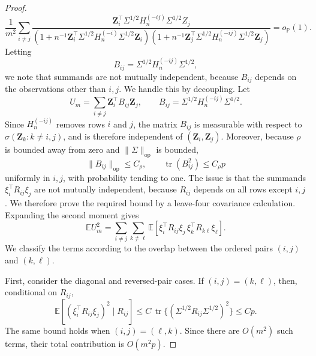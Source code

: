 \documentclass{article}
\theoremstyle{plain}
\theoremstyle{remark}
\def \bZ{\mathbf{Z}}
\def \E{\mathbb{E}}
\def \P{\mathbb{P}}
\def \bZ {{\boldsymbol{Z}}}
\begin{document}
\begin{proof}
\[
\frac{1}{m^2}
\sum_{i\ne j}
\frac{
\bZ_i^\top \Sigma^{1/2}H_n^{(-ij)}\Sigma^{1/2}Z_j
}{
\left(1+n^{-1}\bZ_i^\top \Sigma^{1/2}H_n^{(-i)}\Sigma^{1/2}\bZ_i\right)
\left(1+n^{-1}\bZ_j^\top \Sigma^{1/2}H_n^{(-ij)}\Sigma^{1/2}\bZ_j\right)
}
=o_{\P}(1).
\]
Letting 
\[
B_{ij}=\Sigma^{1/2}H_n^{(-ij)}\Sigma^{1/2},
\]
we note that summands are not mutually independent, because \(B_{ij}\) depends on the
observations other than \(i,j\).  We handle this by decoupling.  Let \[
U_m=\sum_{i\ne j}\bZ_i^\top B_{ij}\bZ_j,
\qquad
B_{ij}=\Sigma^{1/2}H_n^{(-ij)}\Sigma^{1/2}.
\]
Since \(H_n^{(-ij)}\) removes rows \(i\) and \(j\), the matrix \(B_{ij}\) is
measurable with respect to \(\sigma(\bZ_k:k\ne i,j)\), and is therefore
independent of \((\bZ_i,\bZ_j)\).  Moreover, because \(\rho\) is bounded away from
zero and \(\|\Sigma\|_{\mathrm{op}}\) is bounded,
\[
\|B_{ij}\|_{\mathrm{op}}\le C_\rho,\qquad
\operatorname{tr}(B_{ij}^2)\le C_\rho p
\]
uniformly in \(i,j\), with probability tending to one. The issue is that the summands \(\xi_i^\top R_{ij}\xi_j\) are not mutually independent, because
\(R_{ij}\) depends on all rows except \(i,j\).  We therefore prove the required bound by a
leave-four covariance calculation.  Expanding the second moment gives
\[
\E U_m^2
=
\sum_{i\ne j}\sum_{k\ne \ell}
\E\left[
\xi_i^\top R_{ij}\xi_j\,
\xi_k^\top R_{k\ell}\xi_\ell
\right].
\]
We classify the terms according to the overlap between the ordered pairs \((i,j)\) and
\((k,\ell)\).

First, consider the diagonal and reversed-pair cases.  If \((i,j)=(k,\ell)\), then, conditional on
\(R_{ij}\),
\[
\E\left[(\xi_i^\top R_{ij}\xi_j)^2\mid R_{ij}\right]
\le C\,\operatorname{tr}\{(\Sigma^{1/2}R_{ij}\Sigma^{1/2})^2\}
\le Cp.
\]
The same bound holds when \((i,j)=(\ell,k)\).  Since there are \(O(m^2)\) such terms, their total
contribution is \(O(m^2p)\).


\end{proof}
\end{document}
